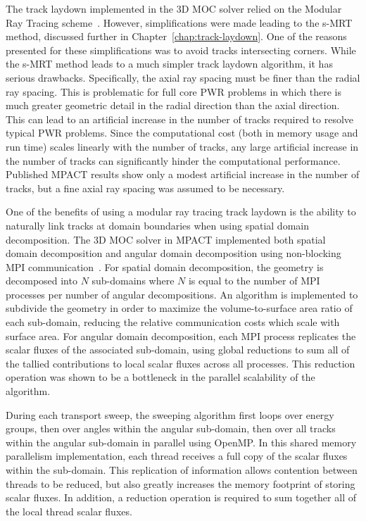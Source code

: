 The track laydown implemented in the 3D \ac{MOC} solver relied on the Modular Ray Tracing scheme~\cite{liu_mrt}. However, simplifications were made leading to the s-MRT method, discussed further in Chapter~\ref{chap:track-laydown}. One of the reasons presented for these simplifications was to avoid tracks intersecting corners. While the s-MRT method leads to a much simpler track laydown algorithm, it has serious drawbacks. Specifically, the axial ray spacing must be finer than the radial ray spacing. This is problematic for full core \ac{PWR} problems in which there is much greater geometric detail in the radial direction than the axial direction. This can lead to an artificial increase in the number of tracks required to resolve typical \ac{PWR} problems. Since the computational cost (both in memory usage and run time) scales linearly with the number of tracks, any large artificial increase in the number of tracks can significantly hinder the computational performance. Published MPACT results show only a modest artificial increase in the number of tracks, but a fine axial ray spacing was assumed to be necessary.


One of the benefits of using a modular ray tracing track laydown is the ability to naturally link tracks at domain boundaries when using spatial domain decomposition. The 3D \ac{MOC} solver in MPACT implemented both spatial domain decomposition and angular domain decomposition using non-blocking \ac{MPI} communication~\cite{mpi}. For spatial domain decomposition, the geometry is decomposed into $N$ sub-domains where $N$ is equal to the number of \ac{MPI} processes per number of angular decompositions. An algorithm is implemented to subdivide the geometry in order to maximize the volume-to-surface area ratio of each sub-domain, reducing the relative communication costs which scale with surface area. For angular domain decomposition, each \ac{MPI} process replicates the scalar fluxes of the associated sub-domain, using global reductions to sum all of the tallied contributions to local scalar fluxes across all processes. This reduction operation was shown to be a bottleneck in the parallel scalability of the algorithm.

During each transport sweep, the sweeping algorithm first loops over energy groups, then over angles within the angular sub-domain, then over all tracks within the angular sub-domain in parallel using OpenMP. In this shared memory parallelism implementation, each thread receives a full copy of the scalar fluxes within the sub-domain. This replication of information allows contention between threads to be reduced, but also greatly increases the memory footprint of storing scalar fluxes. In addition, a reduction operation is required to sum together all of the local thread scalar fluxes.


